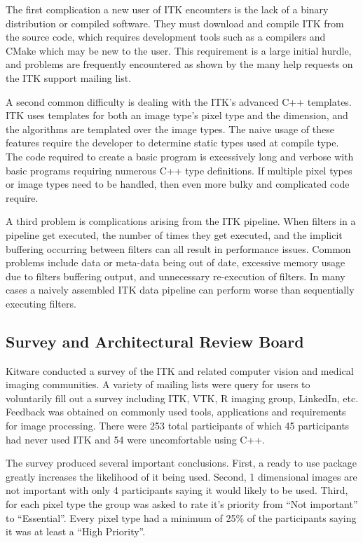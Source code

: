 \documentclass{frontiersMED} %
\begin{document}
The first complication a new user of ITK encounters is the lack of a
binary distribution or compiled software. They must download and
compile ITK from the source code, which requires development tools
such as a compilers and CMake which may be new to the user. This
requirement is a large initial hurdle, and problems are frequently
encountered as shown by the many help requests on the ITK support
mailing list.

A second common difficulty is dealing with the ITK’s advanced C++
templates. ITK uses templates for both an image type’s pixel type and
the dimension, and the algorithms are templated over the image
types. The naive usage of these features require the developer to
determine static types used at compile type.  The code required to
create a basic program is excessively long and verbose with basic
programs requiring numerous C++ type definitions.  If multiple pixel
types or image types need to be handled, then even more bulky and
complicated code require.

A third problem is complications arising from the ITK pipeline. When
filters in a pipeline get executed, the number of times they get
executed, and the implicit buffering occurring between filters can all
result in performance issues. Common problems include data or
meta-data being out of date, excessive memory usage due to filters
buffering output, and unnecessary re-execution of filters. In many
cases a naively assembled ITK data pipeline can perform worse than
sequentially executing filters.


\subsection {Survey and Architectural Review Board}
Kitware conducted a survey of the ITK and related computer vision and
medical imaging communities. A variety of mailing lists were query for
users to voluntarily fill out a survey including ITK, VTK, R imaging
group, LinkedIn, etc. Feedback was obtained on commonly used tools,
applications and requirements for image processing. There were 253
total participants of which 45 participants had never used ITK and 54
were uncomfortable using C++.

The survey produced several important conclusions. First, a ready to
use package greatly increases the likelihood of it being used. Second,
1 dimensional images are not important with only 4 participants saying
it would likely to be used. Third, for each pixel type the group was
asked to rate it’s priority from ``Not important'' to ``Essential''. Every
pixel type had a minimum of 25\% of the participants saying it was at least
a ``High Priority''.
\end{document}
